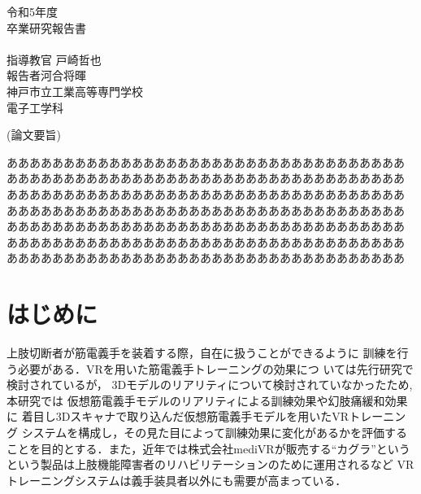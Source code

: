 \documentclass{ltjsreport}
\begin{document}
\begin{titlepage}
\begin{center}
\LARGE 令和5年度\\
\vspace{30pt}
\LARGE 卒業研究報告書\\
\vspace{50pt}
\huge{}\\
\vspace{80pt}
\Large 指導教官 戸崎哲也\\
\Large 報告者\hspace{23pt}河合将暉\\
\vspace{30pt}
\Large 神戸市立工業高等専門学校\\
\Large 電子工学科
\end{center}
\end{titlepage}

\clearpage

\begin{center}
\LARGE (論文要旨)
\end{center}
あああああああああああああああああああああああああああああああああああ
あああああああああああああああああああああああああああああああああああ
あああああああああああああああああああああああああああああああああああ
あああああああああああああああああああああああああああああああああああ
あああああああああああああああああああああああああああああああああああ
あああああああああああああああああああああああああああああああああああ
あああああああああああああああああああああああああああああああああああ

\clearpage
\setcounter{tocdepth}{3}
\tableofcontents

\setcounter{page}{1}
\chapter{はじめに}
	上肢切断者が筋電義手を装着する際，自在に扱うことができるように
	訓練を行う必要がある．VRを用いた筋電義手トレーニングの効果につ
	いては先行研究\cite{ref:1}\cite{ref:2}で検討されているが，
	3Dモデルのリアリティについて検討されていなかったため, 本研究では
	仮想筋電義手モデルのリアリティによる訓練効果や幻肢痛緩和効果に
	着目し3Dスキャナで取り込んだ仮想筋電義手モデルを用いたVRトレーニング
	システムを構成し，その見た目によって訓練効果に変化があるかを評価する
	ことを目的とする．また，近年では株式会社mediVRが販売する``カグラ''という
	という製品は上肢機能障害者のリハビリテーションのために運用されるなど
	VRトレーニングシステムは義手装具者以外にも需要が高まっている．
\end{document}
